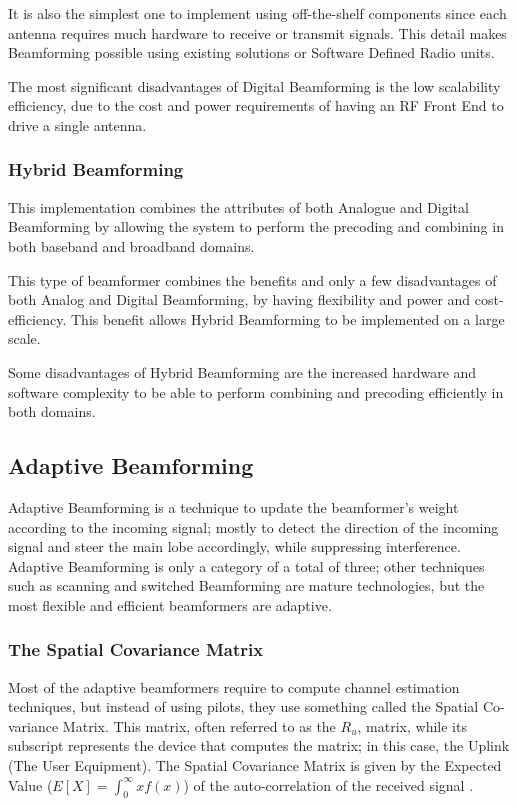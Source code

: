 \documentclass[12pt,a4paper]{report}
\begin{document}
It is also the simplest one to implement using off-the-shelf components since each antenna requires much hardware to receive or transmit signals. This detail makes Beamforming possible using existing solutions or Software Defined Radio units.

The most significant disadvantages of Digital Beamforming is the low scalability efficiency, due to the cost and power requirements of having an RF Front End to drive a single antenna.

\subsubsection{Hybrid Beamforming} \label{back:bf:impl:hbf}
This implementation combines the attributes of both Analogue and Digital Beamforming by allowing the system to perform the precoding and combining in both baseband and broadband domains. 

This type of beamformer combines the benefits and only a few disadvantages of both Analog and Digital Beamforming, by having flexibility and power and cost-efficiency. This benefit allows Hybrid Beamforming to be implemented on a large scale.

Some disadvantages of Hybrid Beamforming are the increased hardware and software complexity to be able to perform combining and precoding efficiently in both domains.

\subsection{Adaptive Beamforming} \label{back:bf:adapt}
Adaptive Beamforming is a technique to update the beamformer's weight according to the incoming signal; mostly to detect the direction of the incoming signal and steer the main lobe accordingly, while suppressing interference. Adaptive Beamforming is only a category of a total of three; other techniques such as scanning and switched Beamforming are mature technologies, but the most flexible and efficient beamformers are adaptive.

\subsubsection{The Spatial Covariance Matrix} \label{back:bf:adapt:scm}
Most of the adaptive beamformers require to compute channel estimation techniques, but instead of using pilots, they use something called the Spatial Co-variance Matrix. This matrix, often referred to as the $R_{u}$, matrix,  while its subscript represents the device that computes the matrix; in this case, the Uplink (The User Equipment). The Spatial Covariance Matrix is given by the Expected Value ($E[X] = \int_{0}^{\infty}xf(x)$) of the auto-correlation of the received signal \cite{Allen2005}.
\end{document}
